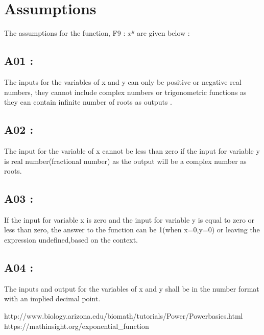 \documentclass[12pt]{report}
\begin{document}
\section{Assumptions}The assumptions for the function, F9 : $x^y$ are given below :
\subsection{A01 :}The inputs for the variables of x and y can only be positive or negative real numbers, they cannot include complex numbers or trigonometric functions as they can contain infinite number of roots as outputs .
\subsection{A02 :}The input for the variable of x cannot be less than zero if the input for variable y is real number(fractional number) as the output will be a complex number as roots.
\subsection{A03 :}If the input for variable x is zero and the input for variable y is equal to zero or less than zero, the answer to the function can be 1(when x=0,y=0) or leaving the expression undefined,based on the context.
\subsection{A04 :}The inputs and output for the variables of x and y shall be in the  number format with an implied decimal point.
\begin{thebibliography}{}
\bibitem{}http://www.biology.arizona.edu/biomath/tutorials/Power/Powerbasics.html
\bibitem{}https://mathinsight.org/exponential\_function


\end{thebibliography}
\end{document}
